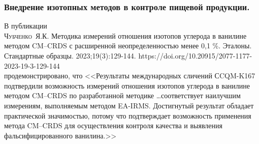 \begin{frame}
\frametitle{Внедрение изотопных методов в контроле пищевой продукции.}
{\small
	В публикации\\ \textsc{Чубченко~Я.К.} Методика измерений отношения изотопов углерода в ванилине методом CM–CRDS с расширенной неопределенностью менее 0,1 \%. Эталоны. Стандартные образцы. 2023;19(3):129-144. https://doi.org/10.20915/2077-1177-2023-19-3-129-144 \\
	продемонстрировано, что
	<<Результаты международных сличений СCQM-K167 подтвердили возможность измерений отношения изотопов
	углерода в ванилине методом CM–CRDS по разработанной методике \ldots соответствует наилучшим измерениям, выполняемым методом EA-IRMS.
	Достигнутый результат обладает практической значимостью, потому что подтверждает возможность применения
	метода CM–CRDS для осуществления контроля качества и выявления фальсифицированного ванилина.>>
}
\end{frame}


